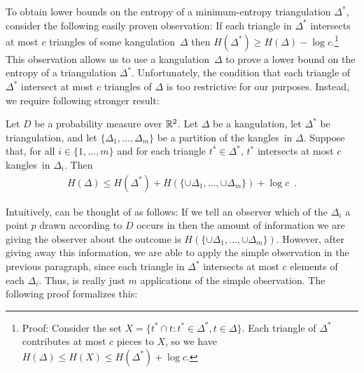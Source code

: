 \documentclass[charterfonts,lotsofwhite]{patmorin}
\newcommand{\kangles}{kangles}
\newcommand{\kangulation}{kangulation}
\begin{document}
To obtain lower bounds on the entropy of a minimum-entropy
triangulation $\Delta^*$, consider the following easily proven
observation: If each triangle in $\Delta^*$ intersects at most $c$
triangles of some \kangulation\ $\Delta$ then $H(\Delta^*) \ge
H(\Delta) - \log c$.\footnote{Proof: Consider the set $X=\{
t^*\cap t : t^*\in\Delta^*, t\in \Delta\}$. Each triangle of
$\Delta^*$ contributes at most $c$ pieces to $X$, so we have
$H(\Delta) \le H(X) \le H(\Delta^*) + \log c$.}  This observation
allows us to use a \kangulation\ $\Delta$ to prove a lower bound on
the entropy of a triangulation $\Delta^*$.  Unfortunately, the
condition that each triangle of $\Delta^*$ intersect at most $c$
triangles of $\Delta$ is too restrictive for our purposes.  Instead,
we require following stronger result:

\begin{lem}
Let $D$ be a probability measure over $\mathbb{R}^2$.  Let $\Delta$ be a
\kangulation, let $\Delta^*$ be triangulation, and let
$\{\Delta_1,\ldots,\Delta_m\}$ be a partition of the \kangles\
in $\Delta$.  Suppose that, for all $i\in\{1,\ldots,m\}$ and for each
triangle $t^*\in\Delta^*$, $t^*$ intersects
at most $c$ \kangles\ in $\Delta_i$.  Then
\begin{eqnarray*}
   H(\Delta) \le 
	 H(\Delta^*) + H(\{\cup\Delta_1,\ldots,\cup\Delta_m\}) + \log c
 \enspace . 
\end{eqnarray*}
\end{lem}

Intuitively,  can be thought of as follows:  If we tell
an observer which of the $\Delta_i$ a point $p$ drawn according to $D$
occurs in then the amount of information we are giving the observer
about the outcome is $H(\{\cup\Delta_1,\ldots,\cup\Delta_m\})$.
However, after giving away this information, we are able to apply the
simple observation in the previous paragraph, since each triangle in
$\Delta^*$ intersects at most $c$ elements of each $\Delta_i$.  Thus,
\lemref{pieces} is really just $m$ applications of the simple
observation.  The following proof formalizes this:
\end{document}

